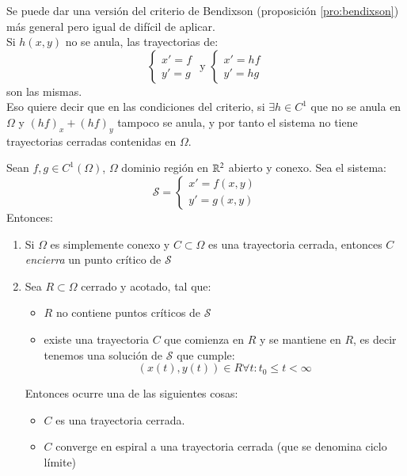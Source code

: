 \begin{obs}
    Se puede dar una versión del criterio de Bendixson (proposición \ref{pro:bendixson}) más general pero igual de difícil de aplicar.\\
    Si $h(x, y)$ no se anula, las trayectorias de:
    $$
        \begin{cases}
            x' = f\\
            y' = g
        \end{cases} \text{ y }
        \begin{cases}
            x' = hf\\
            y' = hg
        \end{cases}
    $$
    son las mismas.\\
    Eso quiere decir que en las condiciones del criterio, si $\exists h \in C^1$ que no se anula en $\Omega$ y $(hf)_x + (hf)_y$ tampoco se anula, y por tanto el sistema no tiene trayectorias cerradas contenidas en $\Omega$.
\end{obs}
\begin{pro}\label{pro:poincare-bendixson}
    Sean $f, g \in C^1(\Omega)$, $\Omega$ dominio región en $\mathbb{R}^2$ abierto y conexo. Sea el sistema:
    $$
        \mathcal{S} =
        \begin{cases}
            x' = f(x, y)\\
            y' = g(x, y)
        \end{cases}
    $$
    Entonces:
    \begin{enumerate}
        \item Si $\Omega$ es simplemente conexo y $C \subset \Omega$ es una trayectoria cerrada, entonces $C$ \textit{encierra} un punto crítico de $\mathcal{S}$
        \item Sea $R \subset \Omega$ cerrado y acotado, tal que:\\
            \begin{itemize}
                \item $R$ no contiene puntos críticos de $\mathcal{S}$
                \item existe una trayectoria $C$ que comienza en $R$ y se mantiene en $R$, es decir tenemos una solución de $\mathcal{S}$ que cumple:
                $$
                    (x(t), y(t)) \in R \forall t : t_0 \leq t < \infty
                $$
            \end{itemize}
            Entonces ocurre una de las siguientes cosas:
            \begin{itemize}
                \item $C$ es una trayectoria cerrada.
                \item $C$ converge en espiral a una trayectoria cerrada (que se denomina ciclo límite)
            \end{itemize}
    \end{enumerate}
\end{pro}
